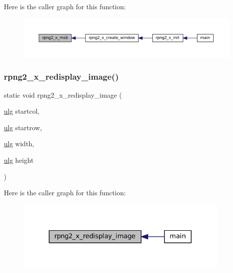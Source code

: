 Here is the caller graph for this function\+:
\nopagebreak
\begin{figure}[H]
\begin{center}
\leavevmode
\includegraphics[width=350pt]{rpng2-x_8c_a6d049c205a7e333060fd97d7a41e71ff_icgraph}
\end{center}
\end{figure}
\mbox{\label{rpng2-x_8c_affab9dec431ea4b549e6ced6d3e416f5}} 
\subsubsection{\texorpdfstring{rpng2\+\_\+x\+\_\+redisplay\+\_\+image()}{rpng2\_x\_redisplay\_image()}}
{\footnotesize\ttfamily static void rpng2\+\_\+x\+\_\+redisplay\+\_\+image (\begin{DoxyParamCaption}\item[{\mbox{\hyperlink{readpng_8h_abd6f60bf9450af2ecb94097a32c19a64}{ulg}}}]{startcol,  }\item[{\mbox{\hyperlink{readpng_8h_abd6f60bf9450af2ecb94097a32c19a64}{ulg}}}]{startrow,  }\item[{\mbox{\hyperlink{readpng_8h_abd6f60bf9450af2ecb94097a32c19a64}{ulg}}}]{width,  }\item[{\mbox{\hyperlink{readpng_8h_abd6f60bf9450af2ecb94097a32c19a64}{ulg}}}]{height }\end{DoxyParamCaption})\hspace{0.3cm}{\ttfamily [static]}}

Here is the caller graph for this function\+:
\nopagebreak
\begin{figure}[H]
\begin{center}
\leavevmode
\includegraphics[width=299pt]{rpng2-x_8c_affab9dec431ea4b549e6ced6d3e416f5_icgraph}
\end{center}
\end{figure}


